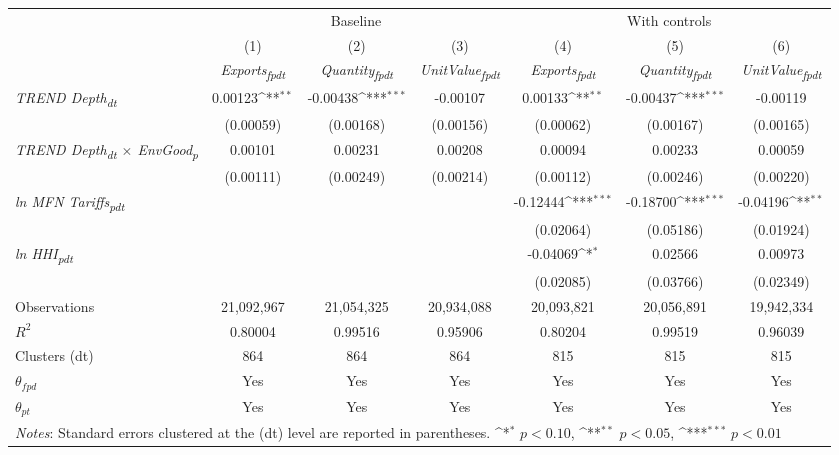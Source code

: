 {
\def\sym#1{\ifmmode^{#1}\else\(^{#1}\)\fi}
\begin{tabular}{l*{6}{c}}
\toprule
&\multicolumn{3}{c}{Baseline}&\multicolumn{3}{c}{With controls}\\\cmidrule(lr){2-4}\cmidrule(lr){5-7}
&(1)&(2)&(3)&(4)&(5)&(6)\\
&\textit{Exports\textsubscript{fpdt}}&\textit{Quantity\textsubscript{fpdt}}&\textit{UnitValue\textsubscript{fpdt}}&\textit{Exports\textsubscript{fpdt}}&\textit{Quantity\textsubscript{fpdt}}&\textit{UnitValue\textsubscript{fpdt}}\\
\midrule
\textit{TREND Depth\textsubscript{dt}} & 0.00123\sym{**} & -0.00438\sym{***} & -0.00107 & 0.00133\sym{**} & -0.00437\sym{***} & -0.00119\\
 & (0.00059) & (0.00168) & (0.00156) & (0.00062) & (0.00167) & (0.00165)\\
\addlinespace
\textit{TREND Depth\textsubscript{dt} $\times$ EnvGood\textsubscript{p}} & 0.00101 & 0.00231 & 0.00208 & 0.00094 & 0.00233 & 0.00059\\
 & (0.00111) & (0.00249) & (0.00214) & (0.00112) & (0.00246) & (0.00220)\\
\addlinespace
\textit{ln MFN Tariffs\textsubscript{pdt}} &  &  &  & -0.12444\sym{***} & -0.18700\sym{***} & -0.04196\sym{**}\\
 &  &  &  & (0.02064) & (0.05186) & (0.01924)\\
\addlinespace
\textit{ln HHI\textsubscript{pdt}} &  &  &  & -0.04069\sym{*} & 0.02566 & 0.00973\\
 &  &  &  & (0.02085) & (0.03766) & (0.02349)\\
\midrule
Observations & 21,092,967 & 21,054,325 & 20,934,088 & 20,093,821 & 20,056,891 & 19,942,334\\
$R^{2}$ & 0.80004 & 0.99516 & 0.95906 & 0.80204 & 0.99519 & 0.96039\\
Clusters (dt) & 864 & 864 & 864 & 815 & 815 & 815\\
$\theta_{fpd}$ & Yes & Yes & Yes & Yes & Yes & Yes\\
$\theta_{pt}$ & Yes & Yes & Yes & Yes & Yes & Yes\\
\bottomrule
\multicolumn{7}{l}{\footnotesize \textit{Notes}: Standard errors clustered at the (dt) level are reported in parentheses. \sym{*} \(p<0.10\), \sym{**} \(p<0.05\), \sym{***} \(p<0.01\)}\\
\end{tabular}
}

